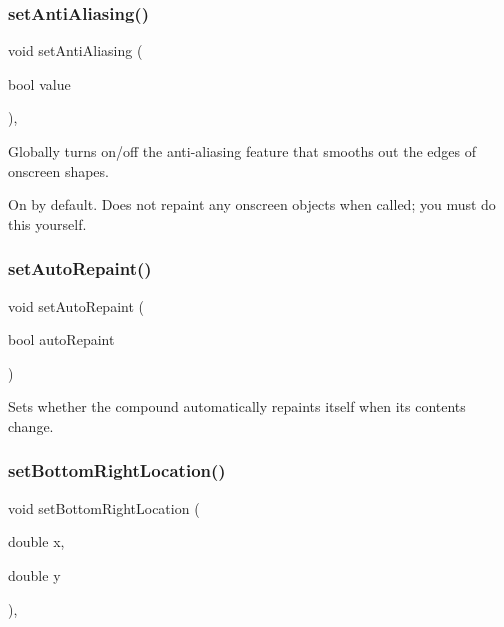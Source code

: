 \subsubsection{\texorpdfstring{set\+Anti\+Aliasing()}{setAntiAliasing()}}
{\footnotesize\ttfamily void set\+Anti\+Aliasing (\begin{DoxyParamCaption}\item[{bool}]{value }\end{DoxyParamCaption})\hspace{0.3cm}{\ttfamily [static]}, {\ttfamily [inherited]}}



Globally turns on/off the anti-\/aliasing feature that smooths out the edges of onscreen shapes. 

On by default. Does not repaint any onscreen objects when called; you must do this yourself. \mbox{\label{classsgl_1_1GCompound_adf10848319457bd6df4c657bf8872bee}} 
\subsubsection{\texorpdfstring{set\+Auto\+Repaint()}{setAutoRepaint()}}
{\footnotesize\ttfamily void set\+Auto\+Repaint (\begin{DoxyParamCaption}\item[{bool}]{auto\+Repaint }\end{DoxyParamCaption})\hspace{0.3cm}{\ttfamily [virtual]}}



Sets whether the compound automatically repaints itself when its contents change. 

\mbox{\label{classsgl_1_1GObject_a71ff7b16b8f1bdc4a1ce9f30cf8b87d8}} 
\subsubsection{\texorpdfstring{set\+Bottom\+Right\+Location()}{setBottomRightLocation()}\hspace{0.1cm}{\footnotesize\ttfamily [1/2]}}
{\footnotesize\ttfamily void set\+Bottom\+Right\+Location (\begin{DoxyParamCaption}\item[{double}]{x,  }\item[{double}]{y }\end{DoxyParamCaption})\hspace{0.3cm}{\ttfamily [virtual]}, {\ttfamily [inherited]}}




